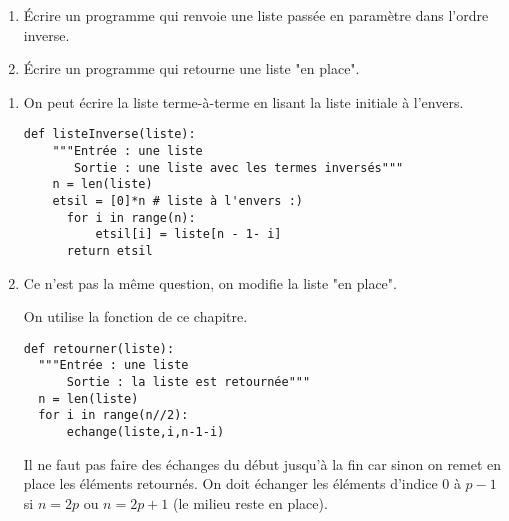 \begin{Exercise}[title= Retourner une liste]
\begin{enumerate}
\item Écrire un programme qui renvoie une liste passée en paramètre dans l'ordre inverse.
\item Écrire un programme qui retourne une liste "en place".
\end{enumerate}
\end{Exercise}
\begin{Answer}
\begin{enumerate}
 \item On peut écrire la liste terme-à-terme en lisant la liste initiale à l'envers.
\begin{lstlisting}
def listeInverse(liste):
 	"""Entrée : une liste
	   Sortie : une liste avec les termes inversés"""
    n = len(liste)
    etsil = [0]*n # liste à l'envers :)
	  for i in range(n): 
	      etsil[i] = liste[n - 1- i]
	  return etsil
\end{lstlisting}
\item Ce n'est pas la même question, on modifie la liste "en place".

On utilise la fonction  de ce chapitre.
\begin{lstlisting}
def retourner(liste):
  """Entrée : une liste
      Sortie : la liste est retournée"""
  n = len(liste)
  for i in range(n//2): 
      echange(liste,i,n-1-i)
\end{lstlisting}
Il ne faut pas faire des échanges du début jusqu'à la fin car sinon on remet en place les éléments retournés.
On doit échanger les éléments d'indice 0 à $p-1$ si $n=2p$ ou $n=2p+1$ (le milieu reste en place).
\end{enumerate}
\end{Answer}


